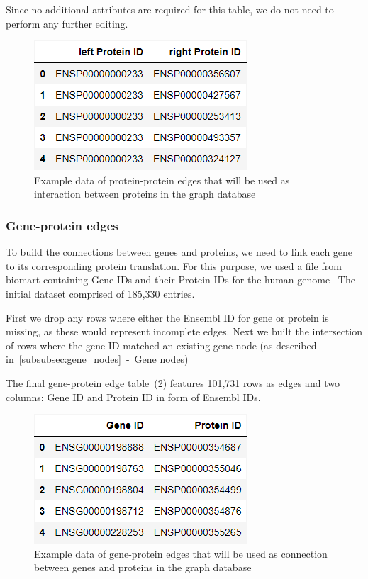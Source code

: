 Since no additional attributes are required for this table, we do not need to perform any further editing.

\begin{figure}[h]
    \centering
    \includegraphics[height=\dfheight]{figures/03_02_protein_edges}
    \caption{Example data of protein-protein edges that will be used as interaction between proteins in the graph database}
    \label{fig:03_02_df_protein_edges}
\end{figure}



\subsubsection*{Gene-protein edges} \label{subsubsec:gene_protein_connections}
To build the connections between genes and proteins, we need to link each gene to its corresponding protein translation.
For this purpose, we used a file from biomart containing Gene IDs and their Protein IDs for the human genome~\cite{bio_marts}
The initial dataset comprised of 185,330 entries.

First we drop any rows where either the Ensembl ID for gene or protein is missing, as these would represent incomplete edges.
Next we built the intersection of rows where the gene ID matched an existing gene node (as described in~\cref{subsubsec:gene_nodes}~-~Gene nodes)

The final gene-protein edge table~(\cref{fig:03_02_df_gene_protein_edges}) features 101,731 rows as edges and two columns:
Gene ID and Protein ID in form of Ensembl IDs.

\begin{figure}[h]
    \centering
    \includegraphics[height=\dfheight]{figures/03_02_gene_protein_edges}
    \caption{Example data of gene-protein edges that will be used as connection between genes and proteins in the graph database}
    \label{fig:03_02_df_gene_protein_edges}
\end{figure}



